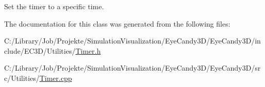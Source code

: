Set the timer to a specific time. 

The documentation for this class was generated from the following files\+:\begin{DoxyCompactItemize}
\item 
C\+:/\+Library/\+Job/\+Projekte/\+Simulation\+Visualization/\+Eye\+Candy3\+D/\+Eye\+Candy3\+D/include/\+E\+C3\+D/\+Utilities/\mbox{\hyperlink{_timer_8h}{Timer.\+h}}\item 
C\+:/\+Library/\+Job/\+Projekte/\+Simulation\+Visualization/\+Eye\+Candy3\+D/\+Eye\+Candy3\+D/src/\+Utilities/\mbox{\hyperlink{_timer_8cpp}{Timer.\+cpp}}\end{DoxyCompactItemize}
